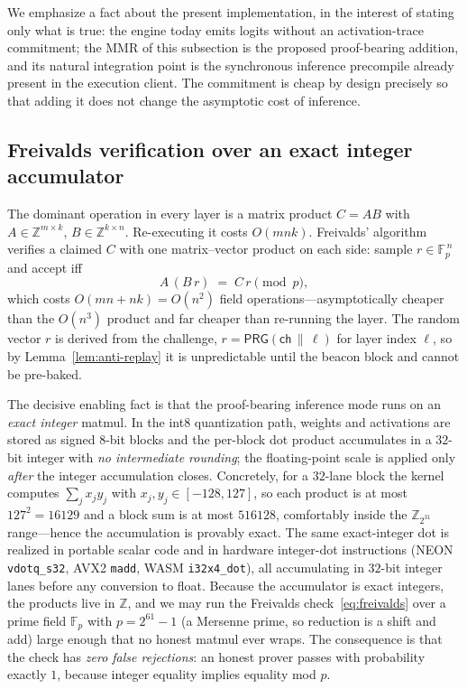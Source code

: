 We emphasize a fact about the present implementation, in the interest of stating
only what is true: the engine today emits logits without an activation-trace
commitment; the MMR of this subsection is the proposed proof-bearing addition, and
its natural integration point is the synchronous inference precompile already
present in the execution client. The commitment is cheap by design precisely so that
adding it does not change the asymptotic cost of inference.

\subsection{Freivalds verification over an exact integer accumulator}

The dominant operation in every layer is a matrix product $C = A B$ with
$A \in \mathbb{Z}^{m\times k}$, $B \in \mathbb{Z}^{k\times n}$. Re-executing it costs
$O(mnk)$. Freivalds' algorithm~\cite{freivalds1979} verifies a claimed $C$ with one
matrix--vector product on each side: sample $r \in \mathbb{F}_p^{\,n}$ and accept iff
\begin{equation}
\label{eq:freivalds}
A\,(B\,r) \;=\; C\,r \pmod p,
\end{equation}
which costs $O(mn + nk) = O(n^2)$ field operations---asymptotically cheaper than the
$O(n^3)$ product and far cheaper than re-running the layer. The random vector $r$ is
derived from the challenge, $r = \mathsf{PRG}(\mathsf{ch} \,\|\, \ell)$ for layer
index $\ell$, so by Lemma~\ref{lem:anti-replay} it is unpredictable until the beacon
block and cannot be pre-baked.

The decisive enabling fact is that the proof-bearing inference mode runs on an
\emph{exact integer} matmul. In the int8 quantization path, weights and activations
are stored as signed $8$-bit blocks and the per-block dot product accumulates in a
$32$-bit integer with \emph{no intermediate rounding}; the floating-point scale is
applied only \emph{after} the integer accumulation closes. Concretely, for a $32$-lane
block the kernel computes $\sum_j x_j y_j$ with $x_j, y_j \in [-128, 127]$, so each
product is at most $127^2 = 16129$ and a block sum is at most $516128$, comfortably
inside the $\mathbb{Z}_{2^{31}}$ range---hence the accumulation is provably exact. The
same exact-integer dot is realized in portable scalar code and in hardware
integer-dot instructions (NEON \texttt{vdotq\_s32}, AVX2 \texttt{madd}, WASM
\texttt{i32x4\_dot}), all accumulating in $32$-bit integer lanes before any
conversion to float. Because the accumulator is exact integers, the products live in
$\mathbb{Z}$, and we may run the Freivalds check~\eqref{eq:freivalds} over a prime
field $\mathbb{F}_p$ with $p = 2^{61}-1$ (a Mersenne prime, so reduction is a shift
and add) large enough that no honest matmul ever wraps. The consequence is that the
check has \emph{zero false rejections}: an honest prover passes with probability
exactly $1$, because integer equality implies equality mod $p$.

